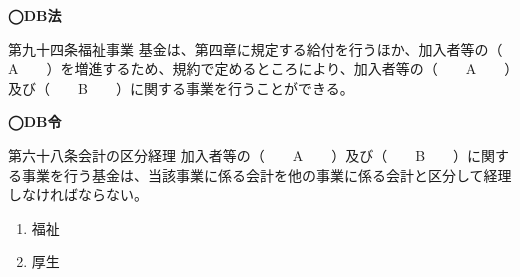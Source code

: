 \begin{fillblank}[自作 \ 2026/10/4]
  \begin{lawstructure}
    \noindent \textbf{◯DB法}
    \begin{lawarticle}{第九十四条}{福祉事業}
      基金は、第四章に規定する給付を行うほか、加入者等の（　　A　　）を増進するため、規約で定めるところにより、加入者等の（　　A　　）及び（　　B　　）に関する事業を行うことができる。
    \end{lawarticle}

    \noindent \textbf{◯DB令}
    \begin{lawarticle}{第六十八条}{会計の区分経理}
      加入者等の（　　A　　）及び（　　B　　）に関する事業を行う基金は、当該事業に係る会計を他の事業に係る会計と区分して経理しなければならない。
    \end{lawarticle}
  \end{lawstructure}
\end{fillblank}

\begin{answerbox}
 \begin{enumerate}[A:]
    \item 福祉
    \item 厚生
  \end{enumerate}
\end{answerbox}

\newpage

